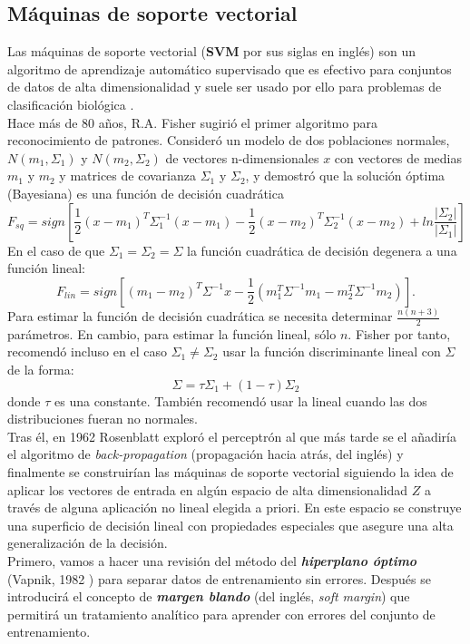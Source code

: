 \subsection{Máquinas de soporte vectorial}
Las máquinas de soporte vectorial (\textbf{SVM} por sus siglas en inglés) son un algoritmo de aprendizaje automático supervisado que es efectivo para conjuntos de datos de alta dimensionalidad y suele ser usado por ello para problemas de clasificación biológica \cite{10.1093/bioinformatics/btw498} \cite{cortes1995support}.\\
Hace más de $80$ años, R.A. Fisher sugirió el primer algoritmo para reconocimiento de patrones. Consideró un modelo de dos poblaciones normales, $N(m_1,\Sigma_1)$ y $N(m_2,\Sigma_2)$ de vectores n-dimensionales $x$ con vectores de medias $m_1$ y $m_2$ y matrices de covarianza $\Sigma_1$ y $\Sigma_2$, y demostró que la solución óptima (Bayesiana) es una función de decisión cuadrática
\[ F_{sq}=sign \left[ \frac{1}{2}(x-m_1)^T \Sigma^{-1}_1 (x-m_1) - \frac{1}{2} (x-m_2)^T \Sigma_2^{-1} (x-m_2) + ln \frac{\vert \Sigma_2 \vert}{\vert \Sigma_1 \vert} \right] \]
En el caso de que $\Sigma_1=\Sigma_2=\Sigma$ la función cuadrática de decisión degenera a una función lineal:
\[ F_{lin}=sign \left[ (m_1-m_2)^T \Sigma^{-1} x - \frac{1}{2}(m_1^T \Sigma^{-1}m_1-m_2^T \Sigma^{-1}m_2)  \right]. \]
Para estimar la función de decisión cuadrática se necesita determinar $\frac{n(n+3)}{2}$ parámetros. En cambio, para estimar la función lineal, sólo $n$. Fisher por tanto, recomendó incluso en el caso $\Sigma_1 \neq \Sigma_2$ usar la función discriminante lineal con $\Sigma$ de la forma:
\[ \Sigma = \tau \Sigma_1 + (1-\tau)\Sigma_2 \]
donde $\tau$ es una constante. También recomendó usar la lineal cuando las dos distribuciones fueran no normales. \cite{cortes1995support}\\
Tras él, en 1962 Rosenblatt exploró el perceptrón al que más tarde se el añadiría el algoritmo de \textit{back-propagation} (propagación hacia atrás, del inglés) y finalmente se construirían las máquinas de soporte vectorial siguiendo la idea de aplicar los vectores de entrada en algún espacio de alta dimensionalidad $Z$ a través de alguna aplicación no lineal elegida a priori. En este espacio se construye una superficio de decisión lineal con propiedades especiales que asegure una alta generalización de la decisión. \cite{cortes1995support}\\
Primero, vamos a hacer una revisión del método del \textbf{\textit{hiperplano óptimo}} (Vapnik, 1982 \cite{cortes1995support}) para separar datos de entrenamiento sin errores. Después se introducirá el concepto de \textbf{\textit{margen blando}} (del inglés, \textit{soft margin}) que permitirá un tratamiento analítico para aprender con errores del conjunto de entrenamiento.\\
